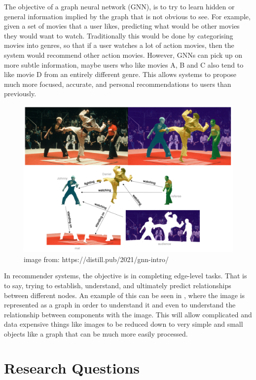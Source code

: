 \documentclass{l4proj}
\begin{document}
The objective of a graph neural network (GNN), is to try to learn hidden or general information implied by the graph that is not obvious to see. For example, given a set of movies that a user likes, predicting what would be other movies they would want to watch. Traditionally this would be done by categorising movies into genres, so that if a user watches a lot of action movies, then the system would recommend other action movies. However, GNNs can pick up on more subtle information, maybe users who like movies A, B and C also tend to like movie D from an entirely different genre. This allows systems to propose much more focused, accurate, and personal recommendations to users than previously. \\

\begin{figure}[h]
    \centering
    \includegraphics[width=\linewidth]{images/image_recognition.png}
    \caption{image from: https://distill.pub/2021/gnn-intro/}
    \label{fig:image_recogniton}
\end{figure}

In recommender systems, the objective is in completing edge-level tasks. That is to say, trying to establish, understand, and ultimately predict relationships between different nodes. An example of this can be seen in , where the image is represented as a graph in order to understand it and even to understand the relationship between components with the image. This will allow complicated and data expensive things like images to be reduced down to very simple and small objects like a graph that can be much more easily processed.

\section{Research Questions}
\end{document}
